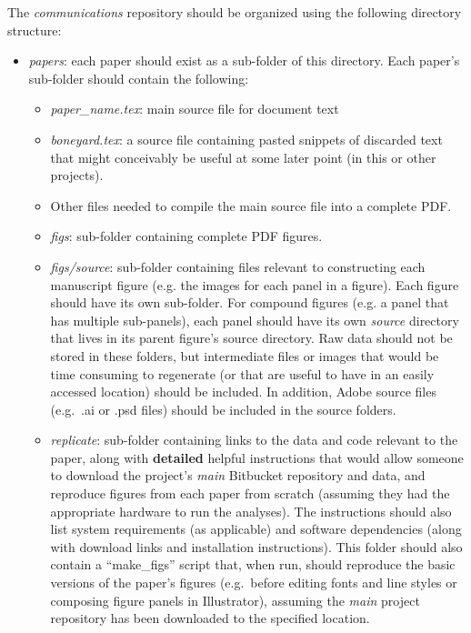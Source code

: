 \documentclass{tufte-book} %
\begin{document}
The \textit{communications} repository should be organized using the following directory structure:
\begin{itemize}
\item \textit{papers}: each paper should exist as a sub-folder of
  this directory.  Each paper's sub-folder should contain the following:
\begin{itemize}
\item \textit{paper\_name.tex}: main source file for document text
\item \textit{boneyard.tex}: a source file containing pasted snippets of
  discarded text that might conceivably be useful at some later point
  (in this or other projects).
\item Other files needed to compile the main source file into a
  complete PDF.
\item \textit{figs}: sub-folder containing complete PDF figures.
\item \textit{figs/source}: sub-folder containing files relevant to
  constructing each manuscript figure (e.g. the images for each panel
  in a figure).  Each figure should have its own sub-folder.  For compound figures (e.g. a panel that has
  multiple sub-panels), each panel should have its own \textit{source}
  directory that lives in its parent figure's source directory.  Raw
  data should not be stored in these folders, but intermediate files
  or images that would be time consuming to regenerate (or that are
  useful to have in an easily accessed location) should be included.
  In addition, Adobe source files (e.g.\ .ai or .psd files) should be
  included in the source folders.
\item \textit{replicate}: sub-folder containing links to the data and code
  relevant to the paper, along with \textbf{detailed} helpful
  instructions that would allow someone to download the project's \textit{main}
  Bitbucket repository and data, and reproduce figures from each paper
  from scratch (assuming they had the appropriate hardware to run the
  analyses).  The instructions should also list system requirements
  (as applicable) and software dependencies (along with download links
  and installation instructions).  This folder should also contain a
  ``make\_figs'' script that, when run, should reproduce the basic 
  versions of the paper's figures (e.g.\ before editing fonts and line
  styles or composing figure panels in Illustrator), assuming the
  \textit{main} project repository has been downloaded to the specified location.
\end{itemize}

\end{itemize}
\end{document}
